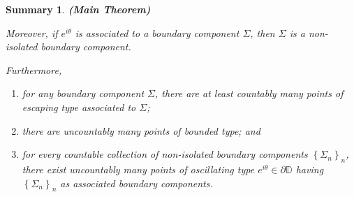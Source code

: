 \documentclass[11pt,a4paper,reqno]{amsart}
\theoremstyle{plain}
\newtheorem{summ}[thm]{Summary}
\theoremstyle{definition}
\theoremstyle{plain}
\begin{document}
\begin{summ}{\bf (Main Theorem)}
\begin{enumerate}[label={\normalfont (\alph*)}]
		\noindent Moreover, if $ e^{i\theta} $ is associated to a boundary component $ \Sigma $, then $ \Sigma $ is a non-isolated boundary component.\label{item:MTbungee}
	\end{enumerate}
	Furthermore,
	\begin{enumerate}[resume, label={\normalfont (\alph*)}]
	\item for any boundary component $ \Sigma $, there are at least countably many points of escaping type associated to $ \Sigma $;\label{item:MTesc-countable}
	\item there are uncountably many points of bounded type; and\label{item:MTbounded-uncountable}
	\item for every countable collection of non-isolated boundary components $ \left\lbrace \Sigma_n \right\rbrace _n$, there exist uncountably many points of oscillating type $ e^{i\theta}\in\partial\mathbb{D} $ having $ \left\lbrace \Sigma_n \right\rbrace _n$ as associated boundary components.\label{item:MTosc-uncountable}
	\end{enumerate}
\end{summ}
\end{document}
